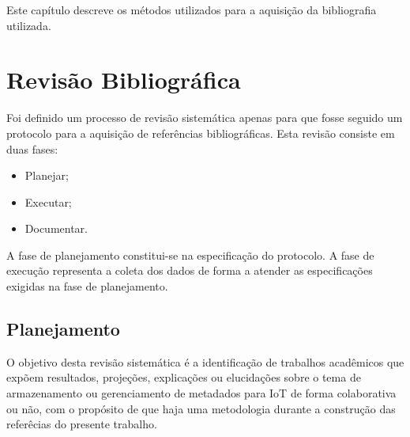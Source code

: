 \newcommand{\texCommand}[1]{\texttt{\textbackslash{#1}}}%

\newcommand{\exemplo}[1]{%
\vspace{\baselineskip}%
\noindent\fbox{\begin{minipage}{\textwidth}#1\end{minipage}}%
\\\vspace{\baselineskip}}%

\newcommand{\exemploVerbatim}[1]{%
\vspace{\baselineskip}%
\noindent\fbox{\begin{minipage}{\textwidth}%
#1\end{minipage}}%
\\\vspace{\baselineskip}}%


\quad Este capítulo descreve os métodos utilizados para a aquisição da bibliografia utilizada.

\section{Revisão Bibliográfica}
\quad Foi definido um processo de revisão sistemática apenas para que fosse seguido um protocolo para a aquisição de referências bibliográficas. Esta revisão consiste em duas fases:
\begin{itemize}
  \item Planejar;
  \item Executar;
  \item Documentar.
\end{itemize}
\quad A fase de planejamento constitui-se na especificação do protocolo.
A fase de execução representa a coleta dos dados de forma a atender as especificações
exigidas na fase de planejamento.

\subsection{Planejamento}
\quad O objetivo desta revisão sistemática é a identificação de trabalhos acadêmicos
que expõem resultados, projeções, explicações ou elucidações sobre o tema de armazenamento ou gerenciamento
de metadados para \acrlong{IoT} de forma colaborativa ou não, com o propósito de que haja uma metodologia durante a construção das referêcias do presente trabalho.

